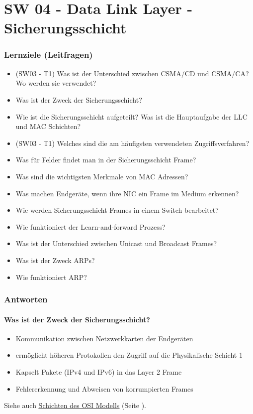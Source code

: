\part{SW 04 - Data Link Layer - Sicherungsschicht}\label{part:sw04}
\section{Lernziele (Leitfragen)}
\begin{itemize}
    \item (SW03 - T1) Was ist der Unterschied zwischen CSMA/CD und CSMA/CA? Wo werden sie verwendet?
    \item Was ist der Zweck der Sicherungsschicht?
    \item Wie ist die Sicherungsschicht aufgeteilt? Was ist die Hauptaufgabe der LLC und MAC Schichten?
    \item (SW03 - T1) Welches sind die am häufigsten verwendeten Zugriffsverfahren?
    \item Was für Felder findet man in der Sicherungsschicht Frame?
    \item Was sind die wichtigsten Merkmale von MAC Adressen?
    \item Was machen Endgeräte, wenn ihre NIC ein Frame im Medium erkennen?
    \item Wie werden Sicherungsschicht Frames in einem Switch bearbeitet?
    \item Wie funktioniert der \flqq Learn-and-forward\frqq{} Prozess?
    \item Was ist der Unterschied zwischen \flqq Unicast\frqq{} und \flqq Broadcast\frqq{} Frames?
    \item Was ist der Zweck ARPs?
    \item Wie funktioniert ARP?
\end{itemize}

\section{Antworten}
\subsection*{Was ist der Zweck der Sicherungsschicht?}\label{sub:Sicherungsschicht}
\begin{itemize}
    \item Kommunikation zwischen Netzwerkkarten der Endgeräten
    \item ermöglicht höheren Protokollen den Zugriff auf die Physikalische Schicht 1
    \item Kapselt Pakete (IPv4 und IPv6) in das Layer 2 Frame
    \item Fehlererkennung und Abweisen von korrumpierten Frames
\end{itemize}
Siehe auch \underline{\hyperref[sub:SchichtenOSIModell]{Schichten des OSI Modells}} (Seite \pageref{sub:SchichtenOSIModell}).

